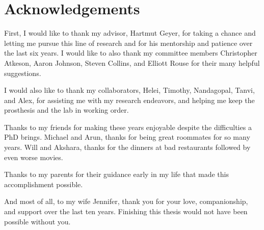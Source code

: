 \chapter*{Acknowledgements}

First, I would like to thank my advisor, Hartmut Geyer, for taking a chance and
letting me pursue this line of research and for his mentorship and patience over
the last six years. I would like to also thank my committee members Christopher
Atkeson, Aaron Johnson, Steven Collins, and Elliott Rouse for their many helpful
suggestions.

I would also like to thank my collaborators, Helei, Timothy, Nandagopal, Tanvi,
and Alex, for assisting me with my research endeavors, and helping me keep the
prosthesis and the lab in working order.

Thanks to my friends for making these years enjoyable despite the difficulties a
PhD brings. Michael and Arun, thanks for being great roommates for so many
years. Will and Akshara, thanks for the dinners at bad restaurants followed by
even worse movies.

Thanks to my parents for their guidance early in my life that made this
accomplishment possible.

And most of all, to my wife Jennifer, thank you for your love, companionship,
and support over the last ten years. Finishing this thesis would not have been
possible without you.
